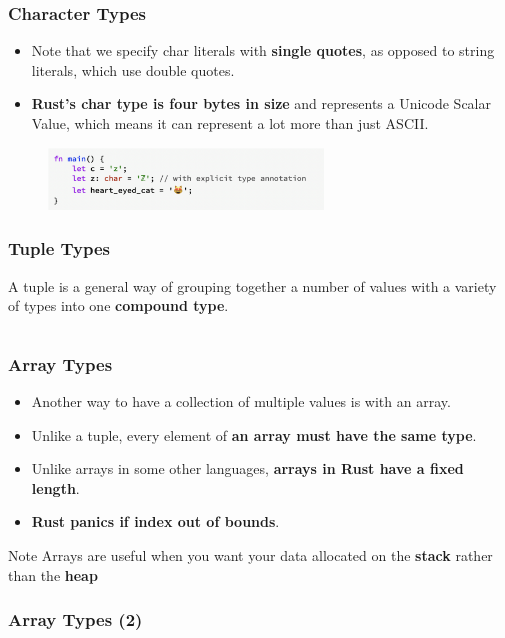 \documentclass{beamer}
\begin{document}
	
	\begin{frame}[fragile]
		\frametitle{Character Types}
		\begin{itemize}
			\item Note that we specify char literals with \textbf{single quotes}, as opposed to string literals, which use double quotes. 
			\item \textbf{Rust’s char type is four bytes in size} and represents a Unicode Scalar Value, which means it can represent a lot more than just ASCII.
		\end{itemize}
		\begin{figure}
			\centering
			\includegraphics[width=0.65\textwidth]{./img/char.png}
		\end{figure}
	\end{frame}
	
	\begin{frame}[fragile]
		\frametitle{Tuple Types}
		A tuple is a general way of grouping together a number of values with a variety of types into one \textbf{compound type}.
		
		\inputminted{rust}{./code/tuple-types.rs}
	\end{frame}
	
	\begin{frame}[fragile]
		\frametitle{Array Types}
		\begin{itemize}
			\item Another way to have a collection of multiple values is with an array. 
			\item Unlike a tuple, every element of \textbf{an array must have the same type}. 
			\item Unlike arrays in some other languages, \textbf{arrays in Rust have a fixed length}.
			\item \textbf{Rust panics if index out of bounds}.
		\end{itemize}
		\begin{block}{Note}
			Arrays are useful when you want your data allocated on the \textbf{stack} rather than the \textbf{heap} 
		\end{block}
		
	\end{frame}
	
	\begin{frame}[fragile]
		\frametitle{Array Types (2)}
		
		\inputminted{rust}{./code/array.rs}
	\end{frame}
	
\end{document}
